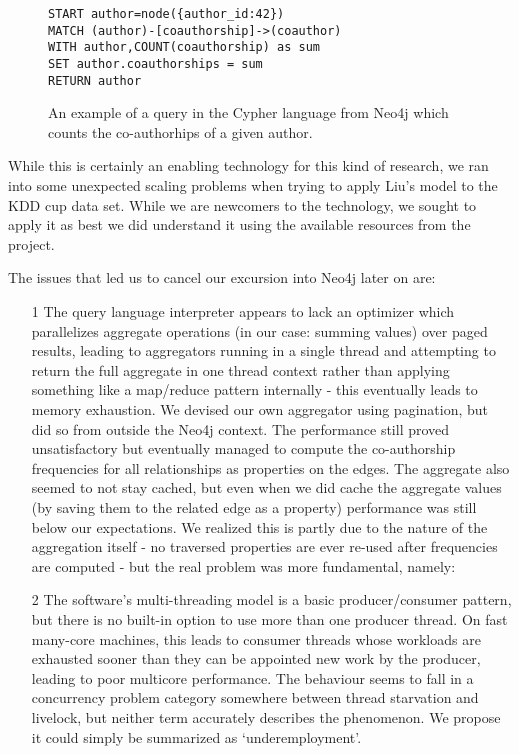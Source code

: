 \begin{figure}
\centering
\begin{verbatim}
START author=node({author_id:42})
MATCH (author)-[coauthorship]->(coauthor)
WITH author,COUNT(coauthorship) as sum
SET author.coauthorships = sum
RETURN author
\end{verbatim}
\caption{An example of a query in the Cypher language from Neo4j which counts the co-authorhips of a given author.}
\label{fig:cypher}
\end{figure}

While this is certainly an enabling technology for this kind of research, we ran into some unexpected scaling problems when trying to apply Liu's model to the KDD cup data set.
While we are newcomers to the technology, we sought to apply it as best we did understand it using the available resources from the project.

The issues that led us to cancel our excursion into Neo4j later on are:

\begin{enumerate}
\item[1] The query language interpreter appears to lack an optimizer which parallelizes aggregate operations (in our case: summing values) over paged results, leading to aggregators running in a single thread and attempting to return the full aggregate in one thread context rather than applying something like a map/reduce pattern internally - this eventually leads to memory exhaustion.
We devised our own aggregator using pagination, but did so from outside the Neo4j context.
The performance still proved unsatisfactory but eventually managed to compute the co-authorship frequencies for all relationships as properties on the edges.
The aggregate also seemed to not stay cached, but even when we did cache the aggregate values (by saving them to the related edge as a property) performance was still below our expectations.
We realized this is partly due to the nature of the aggregation itself - no traversed properties are ever re-used after frequencies are computed - but the real problem was more fundamental, namely:

\item[2] The software's multi-threading model is a basic producer/consumer pattern, but there is no built-in option to use more than one producer thread.
On fast many-core machines, this leads to consumer threads whose workloads are exhausted sooner than they can be appointed new work by the producer, leading to poor multicore performance.
The behaviour seems to fall in a concurrency problem category somewhere between thread starvation and livelock, but neither term accurately describes the phenomenon.
We propose it could simply be summarized as `underemployment'.
\end{enumerate}

